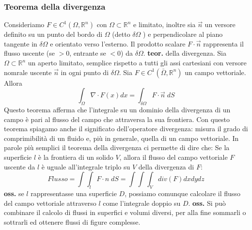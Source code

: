 \subsubsection*{Teorema della divergenza}
Consideriamo $F \in C^1(\Omega, \mathbb{R}^n)$ con $\Omega \subset \mathbb{R}^n$ e limitato, inoltre sia $\vec{n}$ un versore definito su un punto del bordo di $\Omega$ (detto $\delta\Omega$ ) e perpendicolare al piano tangente in $\delta \Omega$ e orientato verso l'esterno.\newline
Il prodotto scalare $F \cdot \vec{n}$ rappresenta il flusso uscente (se $> 0$, entrante se $<0$)  da $\delta\Omega$.\newline
\newline
\textbf{teor.} della divergenza.\newline
Sia $\Omega \subset \mathbb{R}^n$ un aperto limitato, semplice rispetto a tutti gli assi cartesiani con versore nomrale uscente $\vec{n}$ in ogni punto di $\delta\Omega$. Sia $F \in C^1(\bar{\Omega}, \mathbb{R}^n)$ un campo vettoriale. Allora
\[
    \int_\Omega \nabla \cdot  F(x) dx = \int_{\delta\Omega} F \cdot  \vec{n} \; dS
\]
Questo teorema afferma che l'integrale su un dominio della divergenza di un campo è pari al flusso del campo che attraversa la sua frontiera.\newline
Con questo teorema spiagamo anche il significato dell'operatore divergenza: misura il grado di comprimibilità di un fluido e, più in generale, quella di un campo vettoriale.\newline
\newline
In parole più semplici il teorema della divergenza ci permette di dire che:\newline
Se la superficie $l$ è la frontiera di un solido $V$, allora il flusso del campo vettoriale $F$ uscente da $l$ è uguale all'integrale triplo su $V$ della divergenza di $F$:
\[
    Flusso = \int \int_{l}F \cdot n \; dS = \int \int \int_{V} div(F) dx dy dz
\]
\textbf{oss.} se $l$ rappresentasse una superficie $D$, possiamo comunque calcolare il flusso del campo vettoriale attraverso $l$ come l'integrale doppio su $D$.\newline
\textbf{oss.} Si può combinare il calcolo di flussi in superfici e volumi diversi, per alla fine sommarli o sottrarli ed ottenere flussi di figure complesse.